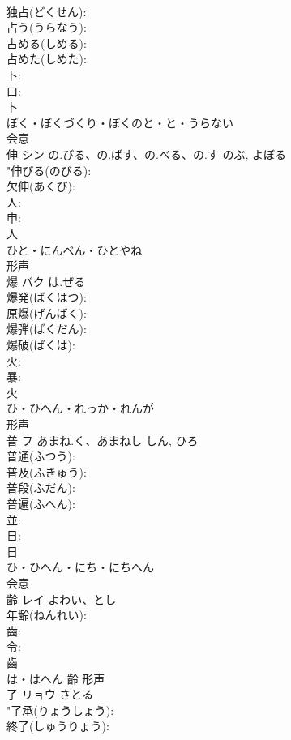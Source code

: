 \documentclass[8pt]{extreport}
\begin{document}
\begin{CJK}{UTF8}{min}
\\	独占(どくせん): 
\\	占う(うらなう): 
\\	占める(しめる): 
\\	占めた(しめた): 
\\	卜: 
\\	口: 
\\	卜	
\\	ぼく・ぼくづくり・ぼくのと・と・うらない	
\\	会意 
\\	伸	シン	の.びる、の.ばす、の.べる、の.す	のぶ, よぼる	
\\	"伸びる(のびる): 
\\	欠伸(あくび): 
\\	人: 
\\	申: 
\\	人	
\\	ひと・にんべん・ひとやね	
\\	形声 
\\	爆	バク	は.ぜる		
\\	爆発(ばくはつ): 
\\	原爆(げんばく): 
\\	爆弾(ばくだん): 
\\	爆破(ばくは): 
\\	火: 
\\	暴: 
\\	火	
\\	ひ・ひへん・れっか・れんが	
\\	形声 
\\	普	フ	あまね.く、あまねし	しん, ひろ	
\\	普通(ふつう): 
\\	普及(ふきゅう): 
\\	普段(ふだん): 
\\	普遍(ふへん): 
\\	並: 
\\	日: 
\\	日	
\\	ひ・ひへん・にち・にちへん	
\\	会意 
\\	齢	レイ	よわい、とし		
\\	年齢(ねんれい): 
\\	齒: 
\\	令: 
\\	齒	
\\	は・はへん	齡	形声 
\\	了	リョウ		さとる	
\\	"了承(りょうしょう): 
\\	終了(しゅうりょう): 

\end{CJK}
\end{document}
